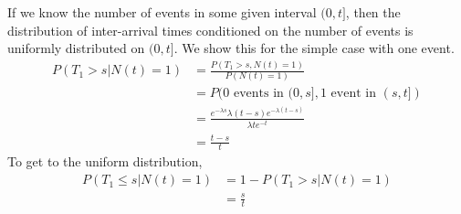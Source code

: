 \documentclass[12pt]{report}
\begin{document}
If we know the number of events in some given interval $(0,t]$, then the distribution of inter-arrival times conditioned on the number of events is uniformly distributed on $(0,t]$. We show this for the simple case with one event.
\begin{align*}
P(T_1 > s | N(t) = 1) &= \frac{P(T_1 > s , N(t) = 1)}{P(N(t) = 1)}\\
&=P(0 \text{ events in } (0,s], 1 \text{ event in } (s, t] )\\
&= \frac{e^{-\lambda s} \lambda (t-s) e^{-\lambda(t-s)} }{\lambda t e^{-t}}\\
&= \frac{t-s}{t}
\end{align*}
To get to the uniform distribution, 
\begin{align*}
P(T_1 \le s | N(t) = 1) &= 1- P(T_1 > s |N(t) =1)\\
&=\frac{s}{t}
\end{align*}
\end{document}
